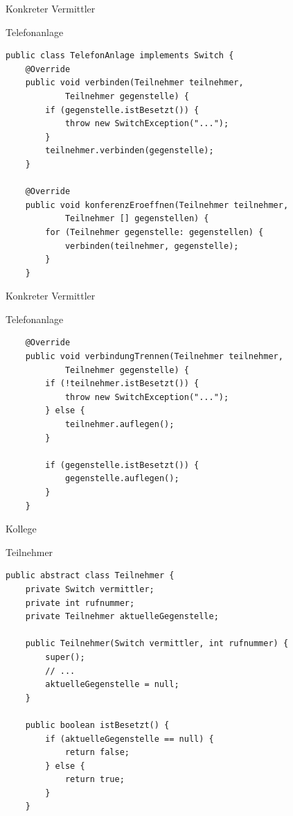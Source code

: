 \begin{frame}[fragile]{Konkreter Vermittler}
	\begin{exampleblock}{Telefonanlage}
 		\begin{lstlisting}
public class TelefonAnlage implements Switch {
	@Override
	public void verbinden(Teilnehmer teilnehmer, 
			Teilnehmer gegenstelle) {
		if (gegenstelle.istBesetzt()) {
			throw new SwitchException("...");
		}
		teilnehmer.verbinden(gegenstelle);
	}
	
	@Override
	public void konferenzEroeffnen(Teilnehmer teilnehmer, 
			Teilnehmer [] gegenstellen) {
		for (Teilnehmer gegenstelle: gegenstellen) {
			verbinden(teilnehmer, gegenstelle);
		}
	}
        \end{lstlisting}
 	\end{exampleblock}
\end{frame}

\begin{frame}[fragile]{Konkreter Vermittler}
	\begin{exampleblock}{Telefonanlage}
 		\begin{lstlisting}
	@Override
	public void verbindungTrennen(Teilnehmer teilnehmer, 
			Teilnehmer gegenstelle) {
		if (!teilnehmer.istBesetzt()) {
			throw new SwitchException("...");
		} else {
			teilnehmer.auflegen();
		}
		
		if (gegenstelle.istBesetzt()) {
			gegenstelle.auflegen();
		} 
	}
        \end{lstlisting}
 	\end{exampleblock}
\end{frame}

\begin{frame}[fragile]{Kollege}
	\begin{exampleblock}{Teilnehmer}
 		\begin{lstlisting}
public abstract class Teilnehmer {
	private Switch vermittler;
	private int rufnummer;
	private Teilnehmer aktuelleGegenstelle;
	
	public Teilnehmer(Switch vermittler, int rufnummer) {
		super();
        // ...
		aktuelleGegenstelle = null;
	}
	
	public boolean istBesetzt() {
		if (aktuelleGegenstelle == null) {
			return false;
		} else {
			return true;
		}
	}
        \end{lstlisting}
 	\end{exampleblock}
\end{frame}

